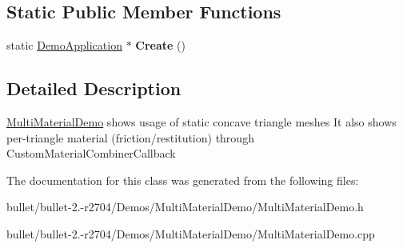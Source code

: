 \subsection*{Static Public Member Functions}
\begin{DoxyCompactItemize}
\item 
\hypertarget{class_multi_material_demo_ab93a3b3df529ee518887ddc1d4749d5c}{static \hyperlink{class_demo_application}{Demo\+Application} $\ast$ {\bfseries Create} ()}\label{class_multi_material_demo_ab93a3b3df529ee518887ddc1d4749d5c}

\end{DoxyCompactItemize}


\subsection{Detailed Description}
\hyperlink{class_multi_material_demo}{Multi\+Material\+Demo} shows usage of static concave triangle meshes It also shows per-\/triangle material (friction/restitution) through Custom\+Material\+Combiner\+Callback 

The documentation for this class was generated from the following files\+:\begin{DoxyCompactItemize}
\item 
bullet/bullet-\/2.-\/r2704/\+Demos/\+Multi\+Material\+Demo/Multi\+Material\+Demo.\+h\item 
bullet/bullet-\/2.-\/r2704/\+Demos/\+Multi\+Material\+Demo/Multi\+Material\+Demo.\+cpp\end{DoxyCompactItemize}
